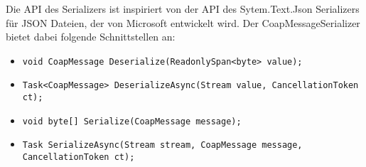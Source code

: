 Die API des Serializers ist inspiriert von der API des Sytem.Text.Json Serializers für JSON Dateien, der von Microsoft entwickelt wird. Der CoapMessageSerializer bietet dabei folgende Schnittstellen an:
\begin{itemize}
    \item \texttt{void CoapMessage Deserialize(ReadonlySpan<byte> value);}
    \item \texttt{Task<CoapMessage> DeserializeAsync(Stream value, CancellationToken ct);}
    \item \texttt{void byte[] Serialize(CoapMessage message);}
    \item \texttt{Task SerializeAsync(Stream stream, CoapMessage message, CancellationToken ct);}
\end{itemize}